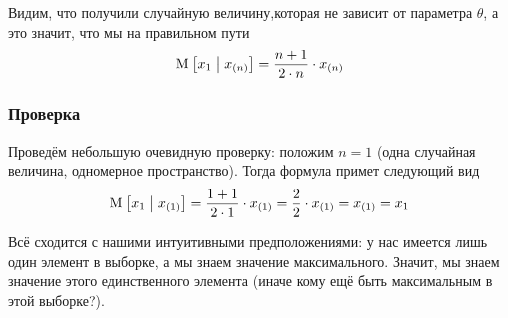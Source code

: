 Видим, что получили случайную величину,которая не зависит от параметра
$\theta$, а это значит, что мы на правильном пути
$$\operatorname{M}_{} \left[ x_1 \;\middle|\; x_{\left( n \right)} \right]
    = \frac{n+1}{2 \cdot n} \cdot x_{\left( n \right)}$$

\subsubsection{Проверка}
Проведём небольшую очевидную проверку: положим $n=1$ (одна случайная величина,
одномерное пространство). Тогда формула примет следующий вид
$$\operatorname{M}_{} \left[ x_1 \;\middle|\; x_{\left( 1 \right)} \right]
    = \frac{1+1}{2 \cdot 1} \cdot x_{\left( 1 \right)}
    = \frac{2}{2} \cdot x_{\left( 1 \right)}
    = x_{\left( 1 \right)} = x_1$$

Всё сходится с нашими интуитивными предположениями: у нас имеется лишь один
элемент в выборке, а мы знаем значение максимального. Значит, мы знаем
значение этого единственного элемента (иначе кому ещё быть максимальным
в этой выборке?).
